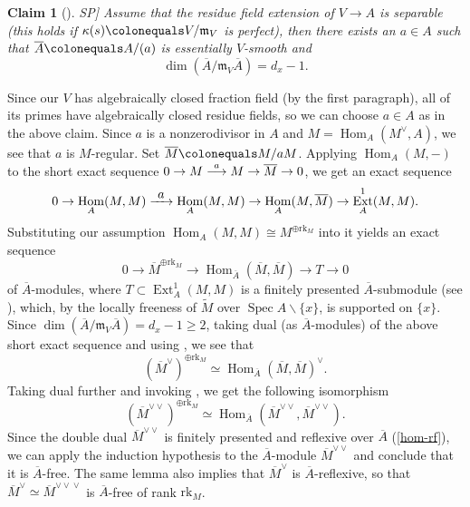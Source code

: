 \documentclass[JEP,XML,SOM,Unicode,published]{cedram}
\newcommand\To[1]{\mathchoice{\xrightarrow{\textstyle\kern4pt#1\kern3pt}}{\stackrel{#1}{\longrightarrow}}{}{}}
\let\oldvee\vee
\renewcommand{\vee}{{\scriptscriptstyle\oldvee}}
\let\backslash\smallsetminus
\let\ov\overline
\let\ce\colonequals
\newcommand{\ddual}{\vee\vee}
\DeclareMathOperator{\Spec}{Spec}
\DeclareMathOperator{\Hom}{Hom}
\DeclareMathOperator{\Ext}{Ext}
\newcommand{\bcl}{\begin{claim}}
\newcommand{\ecl}{\end{claim}}
\providecommand{\SP}[1]{\cite[\href{https://stacks.math.columbia.edu/tag/#1}{#1}]{SP}}
\theoremstyle{plain}
\newtheorem{claim}[equation]{Claim}
\theoremstyle{definition}
\begin{document}
\bcl[\SP{057F}]
Assume that the residue field extension of $V\to A$ is separable (\eg this holds if $\kappa(s)\ce V/\mathfrak{m}_V$ is perfect),
then there exists an $a \in A$ such that $\overline{A}\ce A/(a)$ is essentially $V$-smooth and
\[
\dim(\overline{A}/\mathfrak{m}_V \overline{A})=d_x-1.
\]
\ecl

Since our $V$ has algebraically closed fraction field (by the first paragraph), all of its primes have algebraically closed residue fields, so we can choose $a\in A$ as in the above claim. Since $a$ is a nonzerodivisor in $A$ and $M=\Hom_A(M^{\vee},A)$, we see that $a$ is $M$-regular. Set $\overline{M}\ce M/aM$. Applying $\Hom _A(M,-)$ to the short exact sequence $0\to M \To{a} M \to \ov{M}\to 0$, we get an exact sequence
\[
0\to \Hom_A(M,M)\To{a} \Hom_A(M,M) \to \Hom_A(M,\overline{M}) \to \Ext^1_A(M,M).
\]
Substituting our assumption $\Hom_A(M,M)\cong M^{\oplus \mathrm{rk}_M}$ into it yields an exact sequence
\[
0\to \ov{M}^{\oplus \mathrm{rk}_M} \to \Hom _{\ov{A}}(\ov{M},\ov{M}) \to T\to 0
\]
of $\overline{A}$\nobreakdash-mod\-ules,
where $T\subset \Ext^1_A(M,M)$ is a finitely presented $\overline{A}$-submodule (see ), which,
by the locally freeness of $\widetilde{M}$ over $\Spec A\backslash \{x\}$, is supported on $\{x\}$. Since $\dim(\overline{A}/\mathfrak{m}_V \overline{A})=d_x-1 \ge 2$, taking dual (as $\overline{A}$\nobreakdash-mod\-ules) of the above short exact sequence and using , we see that
\[
(\ov{M}^{\vee})^{\oplus \mathrm{rk}_M} \simeq \Hom _{\overline{A}}(\overline{M},\overline{M})^{\vee}.
\]
Taking dual further and invoking , we get the following isomorphism
\[
(\ov{M}^{\ddual})^{\oplus \mathrm{rk}_M} \simeq \Hom _{\ov{A}}(\ov{M}^{\ddual},\ov{M}^{\ddual}).
\]
Since the double dual $\ov{M}^{\ddual}$ is finitely presented and reflexive over $\ov{A}$ (\eqref{hom-rf}), we can apply the induction hypothesis to the $\ov{A}$\nobreakdash-mod\-ule $\ov{M}^{\ddual}$ and conclude that it is $\ov{A}$-free. The same lemma also implies that $\ov{M}^{\vee}$ is $\ov{A}$-reflexive, so that $\overline{M}^{\vee}\simeq \overline{M}^{\ddual\! \vee}$ is $\ov{A}$-free of rank $\mathrm{rk}_M$.
\end{document}
